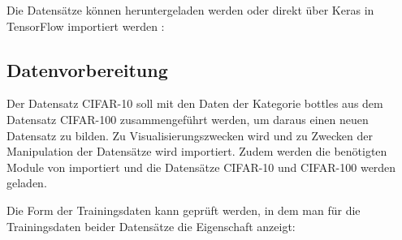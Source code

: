 Die Datensätze können heruntergeladen werden oder direkt über Keras in TensorFlow importiert werden \cite{TensorFlow.14.12.2020,kaggle.21.09.2020,Krizhevsky:2017}:

\medskip








\subsection{Datenvorbereitung}
Der Datensatz CIFAR-10  soll mit den Daten der Kategorie \glqq bottles\grqq{} aus dem Datensatz CIFAR-100 zusammengeführt werden, um daraus einen neuen Datensatz zu bilden. Zu Visualisierungszwecken wird  und zu Zwecken der Manipulation der Datensätze wird  importiert. Zudem werden die benötigten Module von  importiert und die Datensätze CIFAR-10 und CIFAR-100 werden geladen.

\medskip









\medskip

Die Form der Trainingsdaten kann geprüft werden, in dem man für die Trainingsdaten beider Datensätze die Eigenschaft  anzeigt:


\medskip


